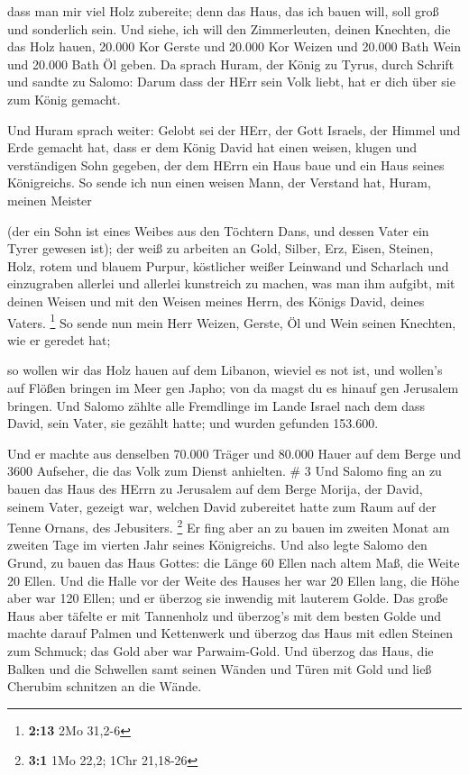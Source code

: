  dass man mir viel Holz zubereite; denn das Haus, das ich
bauen will, soll groß und sonderlich sein.  Und siehe, ich
will den Zimmerleuten, deinen Knechten, die das Holz hauen, 20.000 Kor
Gerste und 20.000 Kor Weizen und 20.000 Bath Wein und 20.000 Bath Öl
geben.  Da sprach Huram, der König zu Tyrus, durch Schrift
und sandte zu Salomo: Darum dass der HErr sein Volk liebt, hat er dich
über sie zum König gemacht.

 Und Huram sprach weiter: Gelobt sei der HErr, der Gott
Israels, der Himmel und Erde gemacht hat, dass er dem König David hat
einen weisen, klugen und verständigen Sohn gegeben, der dem HErrn ein
Haus baue und ein Haus seines Königreichs.  So sende ich
nun einen weisen Mann, der Verstand hat, Huram, meinen Meister

 (der ein Sohn ist eines Weibes aus den Töchtern Dans, und
dessen Vater ein Tyrer gewesen ist); der weiß zu arbeiten an Gold,
Silber, Erz, Eisen, Steinen, Holz, rotem und blauem Purpur, köstlicher
weißer Leinwand und Scharlach und einzugraben allerlei und allerlei
kunstreich zu machen, was man ihm aufgibt, mit deinen Weisen und mit den
Weisen meines Herrn, des Königs David, deines Vaters. \footnote{\textbf{2:13}
  2Mo 31,2-6}  So sende nun mein Herr Weizen, Gerste, Öl
und Wein seinen Knechten, wie er geredet hat;

 so wollen wir das Holz hauen auf dem Libanon, wieviel es
not ist, und wollen's auf Flößen bringen im Meer gen Japho; von da magst
du es hinauf gen Jerusalem bringen.  Und Salomo zählte alle
Fremdlinge im Lande Israel nach dem dass David, sein Vater, sie gezählt
hatte; und wurden gefunden 153.600.

 Und er machte aus denselben 70.000 Träger und 80.000 Hauer
auf dem Berge und 3600 Aufseher, die das Volk zum Dienst anhielten. \# 3
 Und Salomo fing an zu bauen das Haus des HErrn zu Jerusalem
auf dem Berge Morija, der David, seinem Vater, gezeigt war, welchen
David zubereitet hatte zum Raum auf der Tenne Ornans, des Jebusiters.
\footnote{\textbf{3:1} 1Mo 22,2; 1Chr 21,18-26}  Er fing
aber an zu bauen im zweiten Monat am zweiten Tage im vierten Jahr seines
Königreichs.  Und also legte Salomo den Grund, zu bauen das
Haus Gottes: die Länge 60 Ellen nach altem Maß, die Weite 20 Ellen.
 Und die Halle vor der Weite des Hauses her war 20 Ellen
lang, die Höhe aber war 120 Ellen; und er überzog sie inwendig mit
lauterem Golde.  Das große Haus aber täfelte er mit
Tannenholz und überzog's mit dem besten Golde und machte darauf Palmen
und Kettenwerk  und überzog das Haus mit edlen Steinen zum
Schmuck; das Gold aber war Parwaim-Gold.  Und überzog das
Haus, die Balken und die Schwellen samt seinen Wänden und Türen mit Gold
und ließ Cherubim schnitzen an die Wände.

